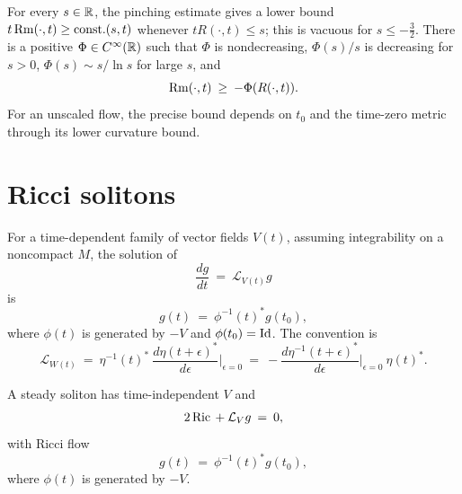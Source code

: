 For every $s\in{\mathbb R}$, the pinching estimate gives a lower bound
$t\operatorname{Rm}(\cdot,t)\geq\operatorname{const.}(s,t)$ whenever $tR(\cdot,t)\leq s$; this is
vacuous for $s\leq-\frac32$. There is a positive
$\Phi\in C^\infty({\mathbb R})$ such that $\Phi$ is nondecreasing,
$\Phi(s)/s$ is decreasing for $s>0$, $\Phi(s)\sim s/\ln s$ for large $s$,
and
\begin{equation} \label{phi}
\operatorname{Rm}(\cdot,t)\: \ge \:-\Phi(R(\cdot,t)).
\end{equation}
For an unscaled flow, the precise bound depends on $t_0$ and the time-zero
metric through its lower curvature bound.

\section{Ricci solitons} \label{Riccisolitons}

For a time-dependent family of vector fields $V(t)$, assuming integrability
on a noncompact $M$, the solution of
\begin{equation}
\frac{dg}{dt}\:=\:{\mathcal L}_{V(t)}g
\end{equation}
is
\begin{equation}
g(t)\:=\:\phi^{-1}(t)^*g(t_0),
\end{equation}
where $\phi(t)$ is generated by $-V$ and $\phi(t_0)=\operatorname{Id}$. The convention is
\begin{equation}
{\mathcal L}_{W(t)}\:=\:\eta^{-1}(t)^*\:
\frac{d\eta(t+\epsilon)^*}{d\epsilon}\Big|_{\epsilon=0}
\:=\:-\frac{d\eta^{-1}(t+\epsilon)^*}{d\epsilon}\Big|_{\epsilon=0}\:\eta(t)^*.
\end{equation}

A steady soliton has time-independent $V$ and
\begin{equation}
2\operatorname{Ric}\:+\:{\mathcal L}_Vg\:=\:0,
\end{equation}
with Ricci flow
\begin{equation}
g(t)\:=\:\phi^{-1}(t)^*g(t_0),
\end{equation}
where $\phi(t)$ is generated by $-V$.

